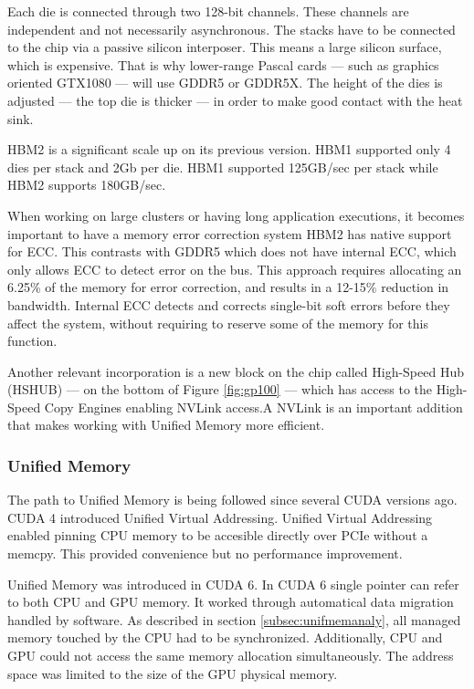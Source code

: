Each die is connected through two 128-bit channels.
These channels are independent and not necessarily asynchronous.
The stacks have to be connected to the chip via a passive silicon interposer.
This means a large silicon surface, which is expensive.
That is why lower-range Pascal cards --- such as graphics oriented GTX1080 --- will use GDDR5 or GDDR5X.
The height of the dies is adjusted --- the top die is thicker --- in order to make good contact with the heat sink.

HBM2 is a significant scale up on its previous version.
HBM1 supported only 4 dies per stack and 2Gb per die.
HBM1 supported 125GB/sec per stack while HBM2 supports 180GB/sec.

When working on large clusters or having long application executions, it becomes important to have a memory error correction system
HBM2 has native support for ECC.
This contrasts with GDDR5 which does not have internal ECC, which only allows ECC to detect error on the bus.
This approach requires allocating an 6.25\% of the memory for error correction, and results in a 12-15\% reduction in bandwidth.
Internal ECC detects and corrects single-bit soft errors before they affect the system, without requiring to reserve some of the memory for this function.

Another relevant incorporation is a new block on the chip called High-Speed Hub (HSHUB) --- on the bottom of Figure \ref{fig:gp100} --- which has access to the High-Speed Copy Engines enabling NVLink access.A
NVLink is an important addition that makes working with Unified Memory more efficient.

\subsubsection{Unified Memory}
The path to Unified Memory is being followed since several CUDA versions ago.
CUDA 4 introduced Unified Virtual Addressing.
Unified Virtual Addressing enabled pinning CPU memory to be accesible directly over PCIe without a memcpy.
This provided convenience but no performance improvement.

Unified Memory was introduced in CUDA 6.
In CUDA 6 single pointer can refer to both CPU and GPU memory.
It worked through automatical data migration handled by software.
As described in section \ref{subsec:unifmemanaly}, all managed memory touched by the CPU had to be synchronized.
Additionally, CPU and GPU could not access the same memory allocation simultaneously.
The address space was limited to the size of the GPU physical memory.

